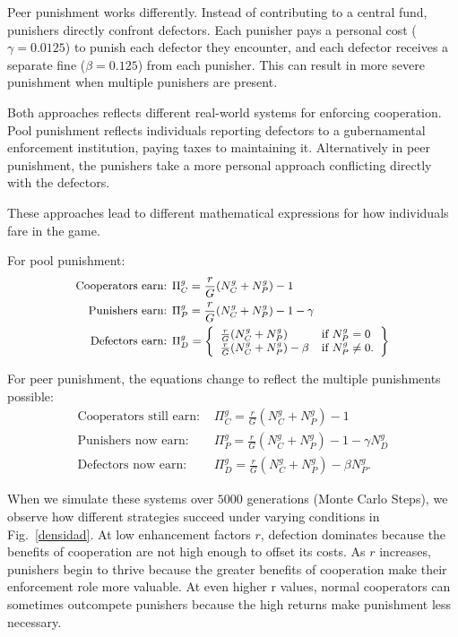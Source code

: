 Peer punishment works differently. Instead of contributing to a central fund, punishers directly confront defectors. Each punisher pays a personal cost (${\gamma=0.0125}$) to punish each defector they encounter, and each defector receives a separate fine ($\beta=0.125$) from each punisher. This can result in more severe punishment when multiple punishers are present.

Both approaches reflects different real-world systems for enforcing cooperation. Pool punishment reflects individuals reporting defectors to a gubernamental enforcement institution, paying taxes to maintaining it. Alternatively in peer punishment, the punishers take a more personal approach conflicting directly with the defectors.


These approaches lead to different mathematical expressions for how individuals fare in the game.

For pool punishment:
\begin{equation}\small
\begin{split}
\text{Cooperators earn: } &\Pi_C^g=\frac{r}{G}(N_C^g+N_P^g)-1 \\
\text{Punishers earn: } &\Pi_P^g=\frac{r}{G}(N_C^g+N_P^g)-1-\gamma \\
\text{Defectors earn: } &\Pi_D^g = \left\{ \begin{array}{ll}
\frac{r}{G}(N_C^g+N_P^g) & \mbox{if $N_P^g=0$} \\
\frac{r}{G}(N_C^g+N_P^g)-\beta & \mbox{if $N_P^g\neq0$}.
\end{array}
\right\}
\end{split}
\end{equation}


For peer punishment, the equations change to reflect the multiple punishments possible:
\begin{equation}
\begin{split}
\text{Cooperators still earn: } &\Pi_C^g=\frac{r}{G}(N_C^g+N_P^g)-1 \\
\text{Punishers now earn: } &\Pi_P^g=\frac{r}{G}(N_C^g+N_P^g)-1-\gamma N_D^g \\
\text{Defectors now earn: } &\Pi_D^g=\frac{r}{G}(N_C^g+N_P^g)-\beta N_P^g.
\end{split}    
\end{equation}



When we simulate these systems over $5000$ generations (Monte Carlo Steps), we observe how different strategies succeed under varying conditions in Fig.~\ref{densidad}. At low enhancement factors $r$, defection dominates because the benefits of cooperation are not high enough to offset its costs. As $r$ increases, punishers begin to thrive because the greater benefits of cooperation make their enforcement role more valuable. At even higher r values, normal cooperators can sometimes outcompete punishers because the high returns make punishment less necessary.

